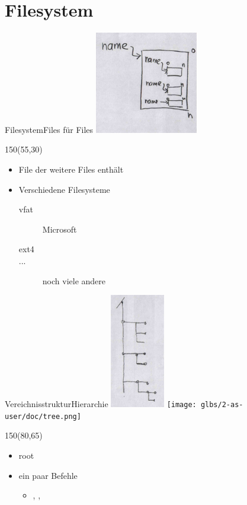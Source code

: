 \documentclass{beamer}
\begin{document}
\section{Filesystem}
\begin{frame}{Filesystem}{Files für Files}
 \includegraphics[width=4.5cm]{filesystem.jpg}
 \begin{textblock}{150}(55,30)
  \begin{itemize}
   \item File der weitere Files enthält
   \item Verschiedene Filesysteme
   \begin{description}
    \item[vfat] Microsoft 
    \item[ext4] \unix
    \item[...] noch viele andere \\
   \end{description}
  \end{itemize}
 \end{textblock}
\end{frame}

\begin{frame}{Vereichnisstruktur}{Hierarchie}
 \includegraphics[height=5cm]{dir-tree.jpg}
 \texttt{[image: glbs/2-as-user/doc/tree.png]}
 \begin{textblock}{150}(80,65)
  \begin{itemize}
   \item \cod{/} root
   \item ein paar Befehle 
   \begin{itemize}
   \item {}, , 
   \end{itemize}
  \end{itemize}
 \end{textblock}
\end{frame}
\end{document}

